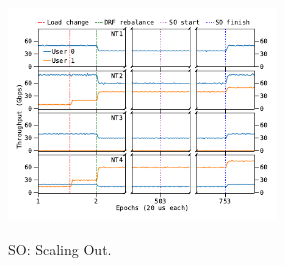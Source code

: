 {
\begin{figure}[th]
\begin{center}
\centerline{\includegraphics[width=2.8in]{Figures/drf.pdf}}
\vspace{-0.2in}
{
SO: Scaling Out.
}
\end{center}
\vspace{-0.3in}
\end{figure}
}